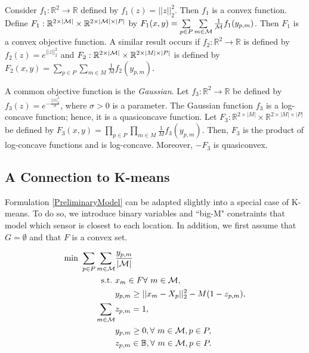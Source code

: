 Consider $f_{1}: \mathbb{R}^{2} \to \mathbb{R}$ defined by $f_{1}(z) = ||z||_{2}^{2}$. Then $f_{1}$ is a convex function. Define $F_{1}: \mathbb{R}^{2\times |\mathcal{M}|} \times \mathbb{R}^{2 \times |\mathcal{M}| \times |P|}$ by $F_{1}(x,y) = \sum\limits_{p \in P}\sum\limits_{m \in \mathcal{M}} \frac{1}{\mathcal{M}}f_{1}(y_{p,m})$. Then $F_{1}$ is a convex objective function. A similar result occurs if $f_{2}:\mathbb{R}^{2} \to \mathbb{R}$ is defined by $f_{2}(z) = e^{||z||_{2}^{2}}$ and $F_{2}: \mathbb{R}^{2\times |\mathcal{M}|} \times \mathbb{R}^{2 \times |M| \times |P|}$ is defined by $F_{2}(x,y) = \sum\limits_{p \in P}\sum\limits_{m \in M} \frac{1}{M}f_{2}(y_{p,m})$. 

A common objective function is the \textit{Gaussian}. Let $f_{3}: \mathbb{R}^{2} \to \mathbb{R}$ be defined by $f_{3}(z) = e^{-\frac{||z||^{2}_{2}}{\sigma}}$, where $\sigma > 0$ is a parameter. The Gaussian function $f_{3}$ is a log-concave function; hence, it is a quasiconcave function. Let $F_{3}:\mathbb{R}^{2\times |M|} \times \mathbb{R}^{2 \times |M| \times |P|}$ be defined by $F_{3}(x,y) = \prod\limits_{p \in P}\prod\limits_{m \in M} \frac{1}{M}f_{3}(y_{p,m})$. Then, $F_{3}$ is the product of log-concave functions and is log-concave. Moreover, $-F_{3}$ is quasiconvex.


\subsection{A Connection to K-means}
Formulation \eqref{PreliminaryModel} can be adapted slightly into a special case of K-means. To do so, we introduce binary variables and ``big-M" constraints that model which sensor is closest to each location. In addition, we first assume that $G = \emptyset$ and that $F$ is a convex set. 

\begin{subequations}\label{KMeansModel}
	\begin{align}                                               
	\min \ \sum\limits_{p \in P}\sum\limits_{m \in \mathcal{M}} &\frac{y_{p,m}}{|\mathcal{M}|} \\
	\text{s.t.}\  & x_{m} \in F \forall \ m \in \mathcal{M}, \\
	&y_{p,m} \geq ||x_{m} - X_{p}||_{2}^{2} - M(1 - z_{p,m}),\\
	\sum\limits_{m \in \mathcal{M}} &z_{p,m} = 1,\\
	&y_{p,m} \geq 0, \forall \ m \in \mathcal{M}, p \in P,\\
	&z_{p,m} \in \mathbb{B}, \forall \ m \in \mathcal{M}, p \in P.
	\end{align}
\end{subequations}

